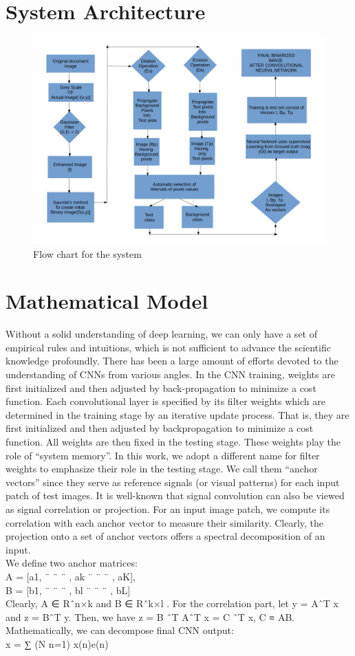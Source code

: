 \documentclass[oneside,a4paper,12pt]{report}
\begin{document}
\section{System Architecture}
\begin{figure}[!htbp]
    \includegraphics[width=\textwidth]{system_architecture.jpg}
	\caption{Flow chart for the system}
\end{figure}
\section{Mathematical Model}
Without a solid understanding of deep learning, we can only have a set of empirical rules and intuitions, which is not sufficient to advance the scientific knowledge profoundly. There has been a large amount of efforts devoted to the understanding of CNNs from various angles.
In the CNN training, weights are first initialized and then adjusted by back-propagation to minimize a cost function.
Each convolutional layer is specified by its filter weights which are determined in the training stage by an iterative update process. That is, they are first initialized and then adjusted by backpropagation to minimize a cost function. All weights are then fixed in the testing stage. These weights play the role of “system memory”. In this work, we adopt a different name for filter weights to emphasize their role in the testing stage. We call them “anchor vectors” since they serve as reference signals (or visual patterns) for each input patch of test images. It is well-known that signal convolution can also be viewed as signal correlation or projection. For an input image patch, we compute its correlation with each anchor vector to measure their similarity. Clearly, the projection onto a set of anchor vectors offers a spectral decomposition of an input.\\
We define two anchor matrices:\\
          A = [a1, ¨ ¨ ¨ , ak ¨ ¨ ¨ , aK],\\
          B = [b1, ¨ ¨ ¨ , bl ¨ ¨ ¨ , bL] 
\\ Clearly, A ∈ Rˆn×k and B ∈ Rˆk×l .
For the correlation part, let y = AˆT x and z = BˆT y. Then, we have z = B ˆT AˆT x = C ˆT x, C ≡ AB.
Mathematically, we can decompose final CNN output:\\
 x = ∑ (N n=1) x(n)e(n)   
 
\end{document}
